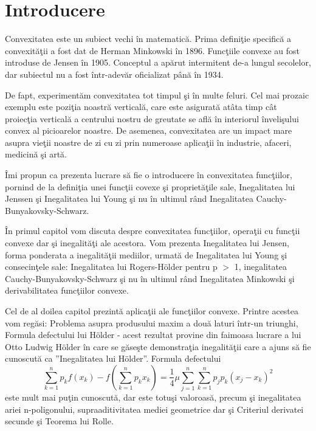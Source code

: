 \documentclass[a4paper,12pt,oneside]{report}
\begin{document}
\chapter*{Introducere}


Convexitatea este un subiect  vechi \^{i}n matematic\u{a}. Prima defini\c{t}ie specific\u{a} a convexit\u{a}\c{t}ii
a fost dat de Herman Minkowski \^{i}n 1896. Func\c{t}iile convexe au fost introduse de Jensen
\^{i}n 1905. Conceptul a ap\u{a}rut intermitent de-a lungul secolelor, dar subiectul
nu a fost \^{i}ntr-adev\u{a}r oficializat p\^{a}n\u{a} \^{i}n 1934.

De fapt, experiment\u{a}m convexitatea tot timpul \c{s}i \^{i}n multe feluri. Cel mai prozaic exemplu este pozi\c{t}ia noastr\u{a} vertical\u{a}, care este asigurat\u{a} at\^{a}ta timp c\^{a}t proiec\c{t}ia vertical\u{a} a centrului nostru de greutate se afl\u{a} \^{i}n interiorul \^{i}nveli\c{s}ului convex al picioarelor noastre. De asemenea, convexitatea are un impact mare asupra vie\c{t}ii noastre de zi cu zi prin numeroase aplica\c{t}ii \^{i}n industrie, afaceri, medicin\u{a} \c{s}i art\u{a}.

\^{I}mi propun ca  prezenta lucrare s\u{a} fie o introducere \^{i}n convexitatea func\c{t}iilor, pornind de la defini\c{t}ia unei func\c{t}ii covexe \c{s}i propriet\u{a}\c{t}ile sale,  Inegalitatea lui Jenssen \c{s}i Inegalitatea lui Young \c{s}i nu \^{i}n ultimul r\^{a}nd Inegalitatea Cauchy-Bunyakovsky-Schwarz.

\^{I}n primul capitol vom discuta despre convexitatea func\c{t}iilor, opera\c{t}ii cu func\c{t}ii convexe dar \c{s}i inegalit\u{a}\c{t}i ale acestora. Vom prezenta Inegalitatea lui Jensen, forma ponderata a inegalit\u{a}\c{t}ii mediilor, urmat\u{a} de Inegalitatea lui Young \c{s}i consecin\c{t}ele sale: Inegalitatea lui Rogers-Hölder pentru p \(>\) 1, inegalitatea Cauchy-Bunyakovsky-Schwarz \c{s}i nu \^{i}n ultimul r\^{a}nd Inegalitatea Minkowski \c{s}i derivabilitatea func\c{t}iilor convexe.

Cel de al doilea capitol prezint\u{a} aplica\c{t}ii ale func\c{t}iilor convexe. Printre acestea vom reg\u{a}si: Problema asupra produsului maxim a dou\u{a} laturi \^{i}ntr-un triunghi, Formula defectului lui Hölder - acest rezultat provine din faimoasa lucrare a lui Otto Ludwig Hölder \^{i}n care se g\u{a}seşte demonstra\c{t}ia inegalit\u{a}ţii care a ajuns s\u{a} fie cunoscut\u{a}  ca ”Inegalitatea lui Hölder”. Formula defectului
\begin{displaymath}
      \sum_{k = 1}^{n}p_{k}f\left ( x_{k} \right ) - f\left ( \sum_{k = 1}^{n} p_{k}x_{k}\right ) = \frac{1}{4}\mu \sum_{j = 1}^{n}\sum_{k = 1}^{n}p_{j}p_{k}\left ( x_{j} - x_{k} \right )^{2}
\end{displaymath}
este mult mai pu\c{t}in cunoscut\u{a}, dar este totu\c{s}i valoroas\u{a}, precum \c{s}i  inegalitatea ariei n-poligonului, supraaditivitatea mediei geometrice dar \c{s}i Criteriul derivatei secunde \c{s}i Teorema lui Rolle.
\end{document}
